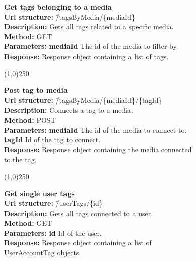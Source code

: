 \documentclass[11pt]{article}
\begin{document}
\begin{tabbing}
\textbf{Get tags belonging to a media} \\
\textcolor{black!60}{\textbf{Url structure:}} \hspace{0.2in} \= /tagsByMedia/\{mediaId\} \\
\textcolor{black!60}{\textbf{Description:}}  \> Gets all tags related to a specific media. \\
\textcolor{black!60}{\textbf{Method:}} \> GET \\
\textcolor{black!60}{\textbf{Parameters:}} \> \textbf{mediaId} The id of the media to filter by. \\
\textcolor{black!60}{\textbf{Response:}} \> Response object containing a list of tags.
\end{tabbing}

\begin{center}\line(1,0){250}\end{center}

\begin{tabbing}
\textbf{Post tag to media} \\
\textcolor{black!60}{\textbf{Url structure:}} \hspace{0.2in} \= /tagsByMedia/\{mediaId\}/\{tagId\} \\
\textcolor{black!60}{\textbf{Description:}}  \> Connects a tag to a media. \\
\textcolor{black!60}{\textbf{Method:}} \> POST \\
\textcolor{black!60}{\textbf{Parameters:}} \> \textbf{mediaId} The id of the media to connect to. \\
\> \textbf{tagId} Id of the tag to connect. \\
\textcolor{black!60}{\textbf{Response:}} \> Response object containing the media connected 
\\ \> to the tag.
\end{tabbing}

\begin{center}\line(1,0){250}\end{center}

\begin{tabbing}
\textbf{Get single user tags} \\
\textcolor{black!60}{\textbf{Url structure:}} \hspace{0.2in} \= /userTags/\{id\} \\
\textcolor{black!60}{\textbf{Description:}}  \> Gets all tags connected to a user. \\
\textcolor{black!60}{\textbf{Method:}} \> GET \\
\textcolor{black!60}{\textbf{Parameters:}} \> \textbf{id} Id of the user. \\
\textcolor{black!60}{\textbf{Response:}} \> Response object containing a list of 
\\ \> UserAccountTag objects.
\end{tabbing}
\end{document}
